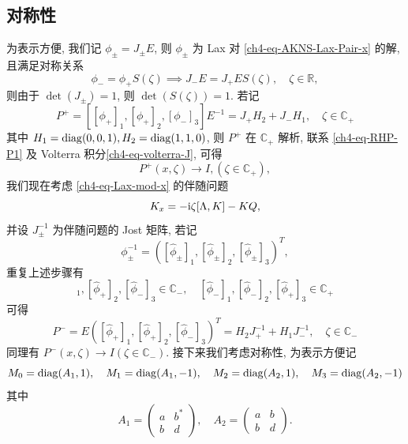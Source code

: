 \subsection{对称性}
为表示方便, 我们记 $\phi_{\pm} = J_{\pm} E$, 则 $\phi_{\pm}$ 为 Lax 对 \eqref{ch4-eq-AKNS-Lax-Pair-x} 的解, 且满足对称关系
\begin{equation}
    \phi_{-} = \phi_{+} S(\zeta) \implies J_{-} E = J_{+} E S(\zeta), \quad \zeta \in \mathbb{R},
\end{equation}
则由于 $\det(J_{\pm}) = 1$, 则 $\det(S(\zeta)) = 1$. 若记
\begin{equation}
    P^{+} = [[\phi_{+}]_{1}, [\phi_{+}]_{2}, [\phi_{-}]_{3}] E^{-1} = J_{+}H_{2} + J_{-}H_{1}, \quad \zeta \in \mathbb{C}_{+} \label{ch4-eq-RHP-P1}
\end{equation}
其中 $ H_{1} = \operatorname{diag}(0,0,1), H_{2} = \operatorname{diag}(1,1,0) $, 则 $ P^{+} $ 在 $ \mathbb{C}_{+} $ 解析, 联系 \eqref{ch4-eq-RHP-P1} 及 Volterra 积分\eqref{ch4-eq-volterra-J}, 可得
\begin{equation}
    P^{+}(x,\zeta) \to I,  (\zeta \in \mathbb{C}_{+}),
\end{equation}
我们现在考虑 \eqref{ch4-eq-Lax-mod-x} 的伴随问题
\begin{equation}
    K_{x} = - \mathrm{i}\zeta [\Lambda, K] - K Q, \label{ch4-eq-Lax-adjoint}
\end{equation}
并设 $ J_{\pm}^{-1} $ 为伴随问题的 Jost 矩阵, 若记
\begin{equation}
    \phi_{\pm}^{-1} = ([\hat{\phi}_{\pm}]_{1}, [\hat{\phi}_{\pm}]_{2}, [\hat{\phi}_{\pm}]_{3})^{T},
\end{equation}
重复上述步骤有
\begin{equation}
    [\hat{\phi}_{+}]_{1}, [\hat{\phi}_{+}]_{2}, [\hat{\phi}_{-}]_{3} \in \mathbb{C}_{-}, \quad [\hat{\phi}_{-}]_{1}, [\hat{\phi}_{-}]_{2}, [\hat{\phi}_{+}]_{3} \in \mathbb{C}_{+}
\end{equation}
可得
\begin{equation}
    P^{-} = E ([\hat{\phi}_{+}]_{1}, [\hat{\phi}_{+}]_{2}, [\hat{\phi}_{-}]_{3})^{T} = H_{2}J_{+}^{-1} + H_{1} J_{-}^{-1}, \quad \zeta \in \mathbb{C}_{-} \label{ch4-eq-RHP-P-minus}
\end{equation}
同理有 $P^{-}(x,\zeta) \to I(\zeta \in \mathbb{C}_{-})$. 接下来我们考虑对称性, 为表示方便记
\begin{equation}
    M_{0} = \operatorname{diag}(A_{1}, 1), \quad M_{1} = \operatorname{diag}(A_{1}, -1), \quad M_{2} = \operatorname{diag}(A_{2}, 1), \quad M_{3} = \operatorname{diag}(A_{2}, -1)
\end{equation}
其中
\begin{equation}A_{1} = \begin{pmatrix}
        a & b^{*} \\
        b & d
    \end{pmatrix}, \quad A_{2} = \begin{pmatrix}
        a & b \\
        b & d
    \end{pmatrix}.
\end{equation}
